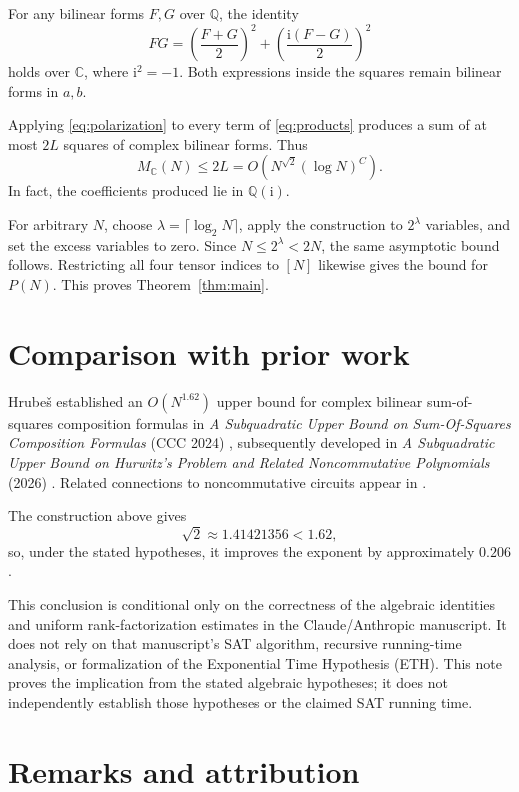 \documentclass[11pt,a4paper]{article}
\newcommand{\CC}{\mathbb C}
\newcommand{\QQ}{\mathbb Q}
\newcommand{\ii}{\mathrm i}
\begin{document}
For any bilinear forms \(F,G\) over \(\QQ\), the identity
\begin{equation}
  FG=
  \left(\frac{F+G}{2}\right)^2
  +\left(\frac{\ii(F-G)}{2}\right)^2
  \label{eq:polarization}
\end{equation}
holds over \(\CC\), where \(\ii^2=-1\). Both expressions inside the
squares remain bilinear forms in \(a,b\).

Applying \eqref{eq:polarization} to every term of \eqref{eq:products}
produces a sum of at most \(2L\) squares of complex bilinear forms. Thus
\[
  M_{\CC}(N)\leq 2L
  =O\!\left(N^{\sqrt{2}}(\log N)^C\right).
\]
In fact, the coefficients produced lie in \(\QQ(\ii)\).

For arbitrary \(N\), choose \(\lambda=\lceil\log_2N\rceil\), apply the
construction to \(2^\lambda\) variables, and set the excess variables to
zero. Since \(N\leq 2^\lambda<2N\), the same asymptotic bound follows.
Restricting all four tensor indices to \([N]\) likewise gives the bound
for \(P(N)\). This proves Theorem~\ref{thm:main}.

\section{Comparison with prior work}

Hrube\v{s} established an \(O(N^{1.62})\) upper bound for complex bilinear
sum-of-squares composition formulas in \emph{A Subquadratic Upper Bound on
Sum-Of-Squares Composition Formulas} (CCC 2024) \cite{hrubes2024},
subsequently developed in \emph{A Subquadratic Upper Bound on Hurwitz's
Problem and Related Noncommutative Polynomials} (2026)
\cite{hrubes2026}. Related connections to noncommutative circuits appear
in \cite{hwy2011}.

The construction above gives
\[
  \sqrt{2}\approx 1.41421356<1.62,
\]
so, under the stated hypotheses, it improves the exponent by
approximately \(0.206\).

This conclusion is conditional only on the correctness of the algebraic
identities and uniform rank-factorization estimates in the
Claude/Anthropic manuscript. It does not rely on that manuscript's SAT
algorithm, recursive running-time analysis, or formalization of the
Exponential Time Hypothesis (ETH). This note proves the implication from
the stated algebraic hypotheses; it does not independently establish
those hypotheses or the claimed SAT running time.

\section{Remarks and attribution}
\end{document}
